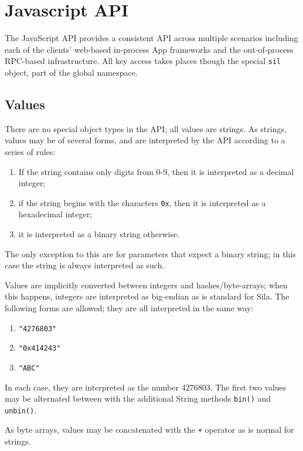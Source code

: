 \section{Javascript API}\label{app:jsapi}

The JavaScript API provides a consistent API across multiple scenarios including each of the clients' web-based in-process \DH{}App frameworks and the out-of-process RPC-based infrastructure. All key access takes places though the special \texttt{sil} object, part of the global namespace.

\subsection{Values}
There are no special object types in the API; all values are strings. As strings, values may be of several forms, and are interpreted by the API according to a series of rules:

\begin{enumerate}
\item If the string contains only digits from 0-9, then it is interpreted as a decimal integer;
\item if the string begins with the characters \texttt{0x}, then it is interpreted as a hexadecimal integer;
\item it is interpreted as a binary string otherwise.
\end{enumerate}

The only exception to this are for parameters that expect a binary string; in this case the string is always interpreted as such.

Values are implicitly converted between integers and hashes/byte-arrays; when this happens, integers are interpreted as big-endian as is standard for Sila. The following forms are allowed; they are all interpreted in the same way:

\begin{enumerate}
\item \texttt{"4276803"}
\item \texttt{"0x414243"}
\item \texttt{"ABC"}
\end{enumerate}

In each case, they are interpreted as the number 4276803. The first two values may be alternated between with the additional String methods \texttt{bin()} and \texttt{unbin()}.

As byte arrays, values may be concatenated with the \texttt{+} operator as is normal for strings.

